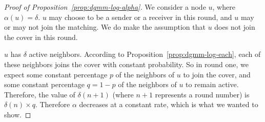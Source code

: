 \begin{proof}[Proof of Proposition~\ref{prop:dgmm-log-alpha}]

We consider a node $u$, where $\alpha(u) = \delta$. $u$ may choose to be a sender or a receiver in this round, and $u$ may or may not join the matching. We do make the assumption that $u$ does not join the cover in this round.

$u$ has $\delta$ active neighbors. According to Proposition~\ref{prop:dgmm-log-each}, each of these neighbors joins the cover with constant probability. So in round one, we expect some constant percentage $p$ of the neighbors of $u$ to join the cover, and some constant percentage $q = 1-p$ of the neighbors of $u$ to remain active. Therefore, the value of $\delta(n+1)$ (where $n+1$ represents a round number) is $\delta(n) \times q$. Therefore $\alpha$ decreases at a constant rate, which is what we wanted to show.

\end{proof}
